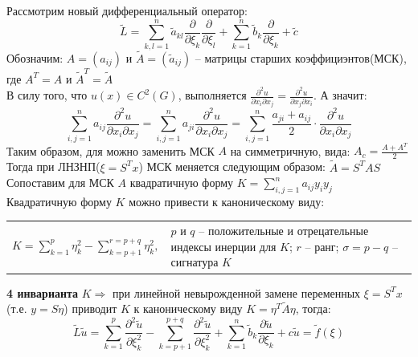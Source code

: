Рассмотрим новый дифференциальный оператор:\\
$$\tilde{L}=\sum_{k,l=1}^{n} \tilde{a}_{kl}\frac{\partial}{\partial \xi_k} \frac{\partial}{\partial \xi_l}
+\sum_{k=1}^{n} \tilde{b}_{k}\frac{\partial }{\partial \xi_k} + \tilde{c}$$
Обозначим: $A = (a_{ij})$ и $\tilde{A} = (\tilde{a}_{ij})$ -- матрицы старших коэффициэнтов(МСК), где $A^T=A$ и $\tilde{A}^T=\tilde{A}$\\
В силу того, что $\displaystyle u(x)\in C^2(G)$, выполняется $\displaystyle \frac{\partial^2 u}{\partial x_i \partial x_j}= \frac{\partial^2 u}{\partial x_j \partial x_i}$. А значит:
$$\sum_{i,j=1}^{n} a_{ij}\frac{\partial^2 u}{\partial x_i\partial x_j}=
  \sum_{i,j=1}^{n} a_{ji}\frac{\partial^2 u}{\partial x_i\partial x_j}=
  \sum_{i,j=1}^{n} \frac{a_{ji}+a_{ij}}{2}\cdot\frac{\partial^2 u}{\partial x_i\partial x_j}$$
Таким образом, для \LDUChPSPPK{} можно заменить МСК $A$ на симметричную, вида: $\displaystyle A_c=\frac{A+A^T}{2}$ \\
Тогда при ЛНЗНП($\displaystyle\xi=S^T x$) МСК меняется следующим образом: $\displaystyle\tilde{A}=S^T A S$\\
Сопоставим для МСК $A$ квадратичную форму $K=\sum_{i,j=1}^n a_{ij}y_i y_j$\\
Квадратичную форму $K$ можно привести к каноническому виду:\\
\begin{tabular}{p{} p{}}
  \hspace{1cm}\(\displaystyle 
  K=\sum_{k=1}^{p}\eta^2_k-\sum_{k=p+1}^{r=p+q}\eta^2_k,
  \) &
  $p$ и $q$ -- положительные и отрецательные индексы инерции для $K$; $r$ -- ранг; $\sigma=p-q$ -- сигнатура $K$
\end{tabular}
\textbf{4 инварианта} $K\Longrightarrow$ при линейной невырожденной замене переменных $\xi = S^T x$ (т.е. $ y=S\eta $) приводит $K$  к каноническому виду $\displaystyle K = \eta^T \tilde{A} \eta$, тогда:
$$ 
  \tilde{L} \tilde{u} =
    \sum^p_{k=1}\frac{\partial^2\tilde u}{\partial \xi^2_k} -
    \sum^{p+q}_{k=p+1}\frac{\partial^2\tilde u}{\partial \xi^2_k} +
    \sum^{n}_{k=1} \tilde{b}_{k}\frac{\partial\tilde u}{\partial \xi_k} + c \tilde u = \tilde f(\xi)
$$

